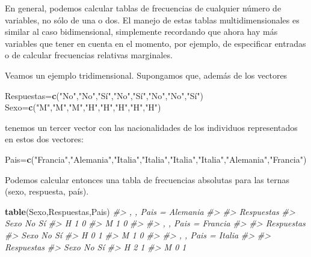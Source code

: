 \documentclass[
]{book}
\newenvironment{Shaded}{\begin{snugshade}}{\end{snugshade}}
\newcommand{\CommentTok}[1]{\textcolor[rgb]{0.56,0.35,0.01}{\textit{#1}}}
\newcommand{\KeywordTok}[1]{\textcolor[rgb]{0.13,0.29,0.53}{\textbf{#1}}}
\newcommand{\NormalTok}[1]{#1}
\newcommand{\StringTok}[1]{\textcolor[rgb]{0.31,0.60,0.02}{#1}}
\theoremstyle{definition}
\theoremstyle{definition}
\theoremstyle{definition}
\theoremstyle{remark}
\begin{document}
En general, podemos calcular tablas de frecuencias de cualquier número de variables, no sólo de una o dos. El manejo de estas tablas multidimensionales es similar al caso bidimensional, simplemente recordando que ahora hay más variables que tener en cuenta en el momento, por ejemplo, de especificar entradas o de calcular frecuencias relativas marginales.

Veamos un ejemplo tridimensional. Supongamos que, además de los vectores

\begin{Shaded}
\begin{Highlighting}[]
\NormalTok{Respuestas=}\KeywordTok{c}\NormalTok{(}\StringTok{"No"}\NormalTok{,}\StringTok{"No"}\NormalTok{,}\StringTok{"Sí"}\NormalTok{,}\StringTok{"No"}\NormalTok{,}\StringTok{"Sí"}\NormalTok{,}\StringTok{"No"}\NormalTok{,}\StringTok{"No"}\NormalTok{,}\StringTok{"Sí"}\NormalTok{)}
\NormalTok{Sexo=}\KeywordTok{c}\NormalTok{(}\StringTok{"M"}\NormalTok{,}\StringTok{"M"}\NormalTok{,}\StringTok{"M"}\NormalTok{,}\StringTok{"H"}\NormalTok{,}\StringTok{"H"}\NormalTok{,}\StringTok{"H"}\NormalTok{,}\StringTok{"H"}\NormalTok{,}\StringTok{"H"}\NormalTok{) }
\end{Highlighting}
\end{Shaded}

tenemos un tercer vector con las nacionalidades de los individuos representados en estos dos vectores:

\begin{Shaded}
\begin{Highlighting}[]
\NormalTok{Pais=}\KeywordTok{c}\NormalTok{(}\StringTok{"Francia"}\NormalTok{,}\StringTok{"Alemania"}\NormalTok{,}\StringTok{"Italia"}\NormalTok{,}\StringTok{"Italia"}\NormalTok{,}\StringTok{"Italia"}\NormalTok{,}\StringTok{"Italia"}\NormalTok{,}\StringTok{"Alemania"}\NormalTok{,}\StringTok{"Francia"}\NormalTok{)}
\end{Highlighting}
\end{Shaded}

Podemos calcular entonces una tabla de frecuencias absolutas para las ternas (sexo, respuesta, país).

\begin{Shaded}
\begin{Highlighting}[]
\KeywordTok{table}\NormalTok{(Sexo,Respuestas,Pais)}
\CommentTok{\#\textgreater{} , , Pais = Alemania}
\CommentTok{\#\textgreater{} }
\CommentTok{\#\textgreater{}     Respuestas}
\CommentTok{\#\textgreater{} Sexo No Sí}
\CommentTok{\#\textgreater{}    H  1  0}
\CommentTok{\#\textgreater{}    M  1  0}
\CommentTok{\#\textgreater{} }
\CommentTok{\#\textgreater{} , , Pais = Francia}
\CommentTok{\#\textgreater{} }
\CommentTok{\#\textgreater{}     Respuestas}
\CommentTok{\#\textgreater{} Sexo No Sí}
\CommentTok{\#\textgreater{}    H  0  1}
\CommentTok{\#\textgreater{}    M  1  0}
\CommentTok{\#\textgreater{} }
\CommentTok{\#\textgreater{} , , Pais = Italia}
\CommentTok{\#\textgreater{} }
\CommentTok{\#\textgreater{}     Respuestas}
\CommentTok{\#\textgreater{} Sexo No Sí}
\CommentTok{\#\textgreater{}    H  2  1}
\CommentTok{\#\textgreater{}    M  0  1}
\end{Highlighting}
\end{Shaded}
\end{document}
